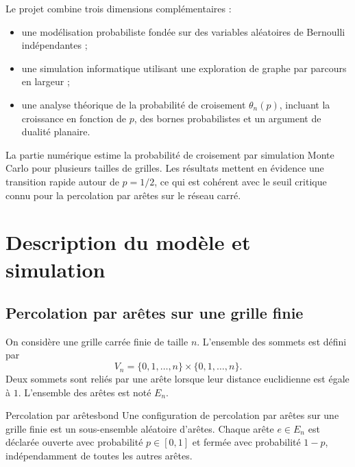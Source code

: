\documentclass[11pt,a4paper]{report}
\begin{document}
Le projet combine trois dimensions complémentaires :
\begin{itemize}
    \item une modélisation probabiliste fondée sur des variables aléatoires de Bernoulli indépendantes ;
    \item une simulation informatique utilisant une exploration de graphe par parcours en largeur ;
    \item une analyse théorique de la probabilité de croisement $\theta_n(p)$, incluant la croissance en fonction de $p$, des bornes probabilistes et un argument de dualité planaire.
\end{itemize}

La partie numérique estime la probabilité de croisement par simulation Monte Carlo pour plusieurs tailles de grilles. Les résultats mettent en évidence une transition rapide autour de $p=1/2$, ce qui est cohérent avec le seuil critique connu pour la percolation par arêtes sur le réseau carré.

\newpage

\tableofcontents
\newpage

\chapter{Description du modèle et simulation}

\section{Percolation par arêtes sur une grille finie}

On considère une grille carrée finie de taille $n$. L'ensemble des sommets est défini par
\[
V_n=\{0,1,\ldots,n\}\times\{0,1,\ldots,n\}.
\]
Deux sommets sont reliés par une arête lorsque leur distance euclidienne est égale à $1$. L'ensemble des arêtes est noté $E_n$.

\begin{definitionbox}{Percolation par arêtes}{bond}
Une configuration de percolation par arêtes sur une grille finie est un sous-ensemble aléatoire d'arêtes. Chaque arête $e\in E_n$ est déclarée ouverte avec probabilité $p\in[0,1]$ et fermée avec probabilité $1-p$, indépendamment de toutes les autres arêtes.
\end{definitionbox}
\end{document}
